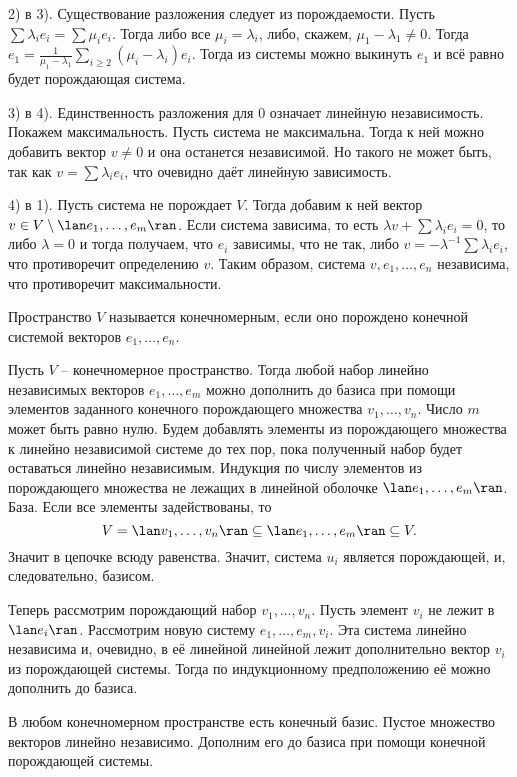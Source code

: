 2) в 3). Существование разложения следует из порождаемости. Пусть $\sum \lambda_i e_i =\sum \mu_i e_i$. Тогда либо все $\mu_i=\lambda_i$, либо, скажем, $\mu_1-\lambda_1 \neq 0$. Тогда  $e_1=\frac{1}{\mu_1-\lambda_1}\sum_{i\geq 2} (\mu_i-\lambda_i) e_i$. Тогда из системы можно выкинуть $e_1$ и всё равно будет порождающая система.

3) в 4). Единственность разложения для 0 означает линейную независимость. Покажем максимальность. Пусть система не максимальна. Тогда к ней можно добавить вектор $v\neq 0$ и она останется независимой. Но такого не может быть, так как $v=\sum \lambda_i e_i$, что очевидно даёт линейную зависимость.

4) в 1). Пусть система не порождает $V$. Тогда добавим к ней вектор $v \in V\setminus \lan e_1,\dots,e_m \ran$. Если система зависима, то есть $\lambda v+ \sum \lambda_i e_i=0$, то либо $\lambda=0$ и тогда получаем, что $e_i$ зависимы, что не так, либо $v=-\lambda^{-1} \sum \lambda_i e_i$, что противоречит определению $v$. Таким образом, система $v,e_1,\dots, e_n$ независима, что противоречит максимальности.
\endproof
\elm

\dfn Пространство $V$ называется конечномерным, если оно порождено конечной системой векторов $e_1,\dots,e_n$.
\edfn

 Пусть $V$ -- конечномерное пространство. Тогда любой набор линейно независимых векторов $e_1,\dots,e_m$ можно дополнить до базиса при помощи элементов заданного конечного порождающего множества $v_1,\dots,v_n$. Число $m$ может быть равно нулю.
\proof Будем добавлять элементы из порождающего множества к линейно независимой системе до тех пор, пока полученный набор будет оставаться линейно независимым.
Индукция по числу элементов из порождающего множества не лежащих в линейной оболочке $\lan e_1,\dots, e_m\ran$. База. Если все элементы задействованы, то
$$ V=\lan v_1,\dots,v_n \ran \subseteq \lan e_1, \dots, e_m \ran \subseteq V.$$
Значит в цепочке всюду равенства. Значит, система $u_i$ является порождающей, и, следовательно, базисом.

Теперь рассмотрим порождающий набор $v_1,\dots,v_n$. Пусть элемент $v_i$ не лежит в $\lan e_{i}\ran$. Рассмотрим новую систему $ e_1,\dots,e_m,v_i$. Эта система линейно независима и, очевидно, в её линейной линейной лежит дополнительно вектор $v_i$ из порождающей системы. Тогда по индукционному предположению её можно дополнить до базиса.
\endproof
\ethrm

\crl В любом конечномерном пространстве есть конечный базис.
\proof Пустое множество векторов линейно независимо. Дополним его до базиса при помощи конечной порождающей системы.
\endproof
\ecrl



